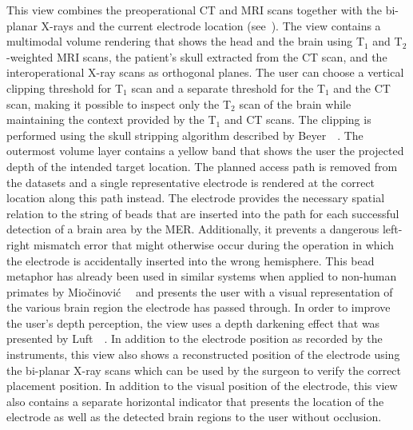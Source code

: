 This  view combines the preoperational CT and MRI scans together with the bi-planar X-rays and the current electrode location (see~).  The view contains a multimodal volume rendering that shows the head and the brain using T$_1$ and T$_2$-weighted MRI scans, the patient's skull extracted from the CT scan, and the interoperational X-ray scans as orthogonal planes.  The user can choose a vertical clipping threshold for T$_1$ scan and a separate threshold for the T$_1$ and the CT scan, making it possible to inspect only the T$_2$ scan of the brain while maintaining the context provided by the T$_1$ and CT scans.  The clipping is performed using the skull stripping algorithm described by Beyer~\etal~\cite{beyer2007high}.  The outermost volume layer contains a yellow band that shows the user the projected depth of the intended target location.  The planned access path is removed from the datasets and a single representative electrode is rendered at the correct location along this path instead.  The electrode provides the necessary spatial relation to the string of beads that are inserted into the path for each successful detection of a brain area by the MER.  Additionally, it prevents a dangerous left-right mismatch error that might otherwise occur during the operation in which the electrode is accidentally inserted into the wrong hemisphere.  This bead metaphor has already been used in similar systems when applied to non-human primates by Mio\v{c}inovi\'{c}~\etal~\cite{miocinovic2007stereotactic} and presents the user with a visual representation of the various brain region the electrode has passed through.  In order to improve the user's depth perception, the view uses a depth darkening effect that was presented by Luft~\etal~\cite{luft2006image}.  In addition to the electrode position as recorded by the instruments, this view also shows a reconstructed position of the electrode using the bi-planar X-ray scans which can be used by the surgeon to verify the correct placement position.  In addition to the visual position of the electrode, this view also contains a separate horizontal indicator that presents the location of the electrode as well as the detected brain regions to the user without occlusion.



